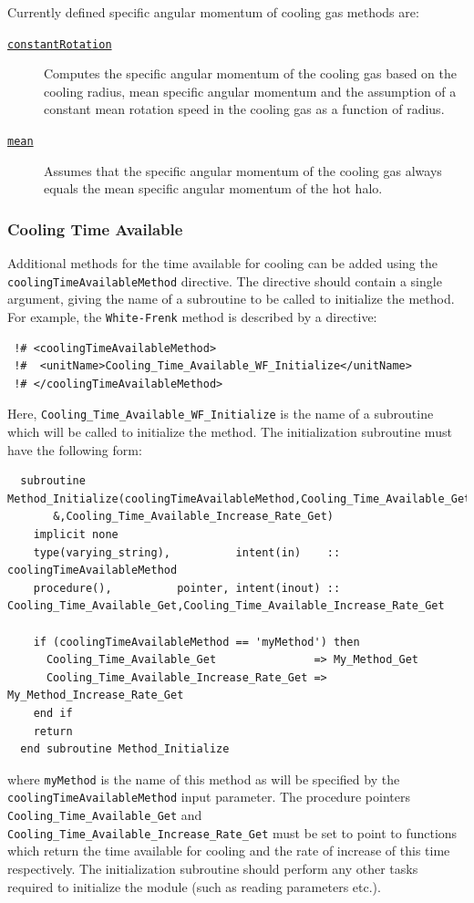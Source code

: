Currently defined specific angular momentum of cooling gas methods are:
\begin{description}
 \item [\hyperlink{cooling.specific_angular_momentum.constant_rotation.F90:cooling_specific_angular_momenta_constant_rotation:cooling_specific_angular_momentum_constant_rotation}{{\tt constantRotation}}] Computes the specific angular momentum of the cooling gas based on the cooling radius, mean specific angular momentum and the assumption of a constant mean rotation speed in the cooling gas as a function of radius.
 \item [\hyperlink{cooling.specific_angular_momentum.mean.F90:cooling_specific_angular_momenta_mean:cooling_specific_angular_momentum_mean}{{\tt mean}}] Assumes that the specific angular momentum of the cooling gas always equals the mean specific angular momentum of the hot halo.
\end{description}

\subsubsection{Cooling Time Available}

Additional methods for the time available for cooling can be added using the {\tt coolingTimeAvailableMethod} directive. The directive should contain a single argument, giving the name of a subroutine to be called to initialize the method. For example, the {\tt White-Frenk} method is described by a directive:
\begin{verbatim}
 !# <coolingTimeAvailableMethod>
 !#  <unitName>Cooling_Time_Available_WF_Initialize</unitName>
 !# </coolingTimeAvailableMethod>
\end{verbatim}
Here, {\tt Cooling\_Time\_Available\_WF\_Initialize} is the name of a subroutine which will be called to initialize the method. The initialization subroutine must have the following form:
\begin{verbatim}
  subroutine Method_Initialize(coolingTimeAvailableMethod,Cooling_Time_Available_Get&
       &,Cooling_Time_Available_Increase_Rate_Get)
    implicit none
    type(varying_string),          intent(in)    :: coolingTimeAvailableMethod
    procedure(),          pointer, intent(inout) :: Cooling_Time_Available_Get,Cooling_Time_Available_Increase_Rate_Get
    
    if (coolingTimeAvailableMethod == 'myMethod') then
      Cooling_Time_Available_Get               => My_Method_Get
      Cooling_Time_Available_Increase_Rate_Get => My_Method_Increase_Rate_Get
    end if
    return
  end subroutine Method_Initialize
\end{verbatim}
where {\tt myMethod} is the name of this method as will be specified by the {\tt coolingTimeAvailableMethod} input parameter. The procedure pointers {\tt Cooling\_Time\_Available\_Get} and {\tt Cooling\_Time\_Available\_Increase\_Rate\_Get} must be set to point to functions which return the time available for cooling and the rate of increase of this time respectively. The initialization subroutine should perform any other tasks required to initialize the module (such as reading parameters etc.).

